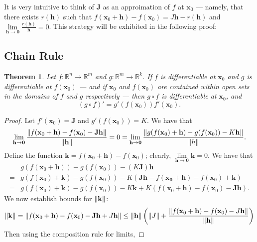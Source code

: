 \documentclass[11pt]{article}
\renewcommand{\vec}[1]{\mathbf{#1}}
\newcommand{\mat}[1]{\mathbf{#1}}
\newtheorem*{theorem*}{Theorem}
\begin{document}
It is very intuitive to think of $\mat{J}$ as an approimation of $f$ at $\vec{x}_{0}$ --- namely, that there exists $r(\vec{h})$ such that $f(\vec{x}_{0} + \vec{h}) - f(\vec{x}_{0}) = J \vec{h} - r(\vec{h})$ and $\lim\limits_{\vec{h} \to \vec{0}} \tfrac{r(\vec{h})}{\vec{h}} = 0$. This strategy will be exhibited in the following proof:

\subsection{Chain Rule}

\begin{adjustwidth}{0.5cm}{}
	\begin{theorem*}
		Let $f : \mathbb{R}^{n} \to \mathbb{R}^{m}$ and $g : \mathbb{R}^{m} \to \mathbb{R}^{k}$. If $f$ is differentiable at $\vec{x}_{0}$ and $g$ is differentiable at $f(\vec{x}_{0})$ --- and if $\vec{x}_{0}$ and $f(\vec{x}_{0})$ are contained within open sets in the domains of $f$ and $g$ respectively --- then $g \circ f$ is differentiable at $\vec{x}_{0}$, and
		\[
			(g \circ f)' = g'(f(\vec{x}_{0})) f'(\vec{x}_{0}).
		\]
	\end{theorem*}
    \begin{proof}\renewcommand{\qedsymbol}{}
		Let $f'(\vec{x}_{0}) = \mat{J}$ and $g'(f(\vec{x}_{0})) = K$. We have that
		\[
		\lim\limits_{\vec{h} \to \vec{0}} \frac{\norm{f(\vec{x}_{0} + \vec{h}) - f(\vec{x}_{0}) - \mat{J} \vec{h}}}{\norm{\vec{h}}} = 0 = \lim\limits_{\vec{h} \to \vec{0}} \frac{\norm{g(f(\vec{x}_{0}) + \vec{h}) - g(f(\vec{x}_{0})) - K \vec{h}}}{\norm{h}}.
		\]
		Define the function $\vec{k} = f(\vec{x}_{0} + \vec{h}) - f(\vec{x}_{0})$; clearly, $\lim\limits_{\vec{h} \to \vec{0}} \vec{k} = 0$. We have that
		\begin{align*}
			& g(f(\vec{x}_{0} + \vec{h})) - g(f(\vec{x}_{0})) - (K\mat{J}) \vec{h} \\
			=& g(f(\vec{x}_{0}) + \vec{k}) - g(f(\vec{x}_{0})) - K(\mat{J} \vec{h} - f(\vec{x_{0} + \vec{h}}) - f(\vec{x}_{0}) + \vec{k}) \\
			=& g(f(\vec{x}_{0}) + \vec{k}) - g(f(\vec{x}_{0})) - K \vec{k} + K(f(\vec{x}_{0} + \vec{h}) - f(\vec{x}_{0}) - \mat{J} \vec{h}).
		\end{align*}
		We now establish bounds for $\norm{\vec{k}}$: 
		\[
			\norm{\vec{k}} = \norm{f(\vec{x}_{0} + \vec{h}) - f(\vec{x}_{0}) - \mat{J} \vec{h} + J \vec{h}} \le \norm{\vec{h}} \left(\norm{J} + \frac{\norm{f(\vec{x}_{0} + \vec{h}) - f(\vec{x}_{0}) - J \vec{h}}}{\norm{\vec{h}}}\right)
		\]
		Then using the composition rule for limits,

\end{proof}
\end{adjustwidth}
\end{document}
